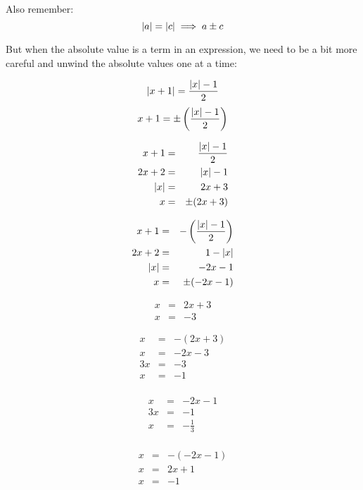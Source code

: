 \documentclass[letterpaper,12pt,fleqn]{article}
\begin{document}
Also remember:
\[\lvert a\rvert=\lvert c\rvert\implies a\pm c\]

But when the absolute value is a term in an expression, we need to be a bit
more careful and unwind the absolute values one at a time:

\[\lvert x+1\rvert=\frac{\lvert x\rvert-1}{2}\]
\[x+1=\pm\left(\frac{\lvert x\rvert-1}{2}\right)\]

\begin{minipage}[t]{2.5in}
  \begin{eqnarray*}
    x+1 &=& \frac{\lvert x\rvert-1}{2} \\
    2x+2 &=& \lvert x\rvert-1 \\
    \lvert x\rvert &=& 2x+3 \\
    x &=& \pm(2x+3) \\
  \end{eqnarray*}
\end{minipage}
\begin{minipage}[t]{2.5in}
  \begin{eqnarray*}
    x+1 &=& -\left(\frac{\lvert x\rvert-1}{2}\right) \\
    2x+2 &=& 1-\lvert x\rvert \\
    \lvert x\rvert &=& -2x-1 \\
    x &=& \pm(-2x-1) \\
  \end{eqnarray*}
\end{minipage}

\begin{minipage}[t]{2.5in}
  \begin{eqnarray*}
    x &=& 2x+3 \\
    x &=& -3
  \end{eqnarray*}
\end{minipage}
\begin{minipage}[t]{2.5in}
  \begin{eqnarray*}
    x &=& -(2x+3) \\
    x &=& -2x-3 \\
    3x &=& -3 \\
    x &=& -1 \\
  \end{eqnarray*}
\end{minipage}

\begin{minipage}[t]{2.5in}
  \begin{eqnarray*}
    x &=& -2x-1 \\
    3x &=& -1 \\
    x &=& -\frac{1}{3} \\
  \end{eqnarray*}
\end{minipage}
\begin{minipage}[t]{2.5in}
  \begin{eqnarray*}
    x &=& -(-2x-1) \\
    x &=& 2x+1 \\
    x &=& -1 \\
  \end{eqnarray*}
\end{minipage}
\end{document}
